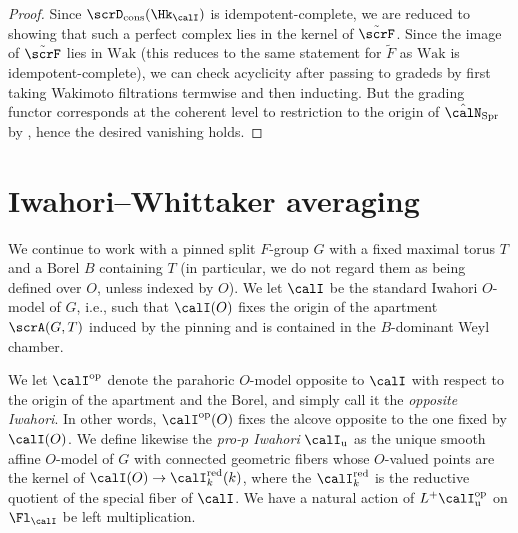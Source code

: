 \documentclass[10pt, reqno]{amsart}
\theoremstyle{plain}
\theoremstyle{definition}
\numberwithin{equation}{section}
\begin{document}
\begin{proof}
	Since $\scrD_{\mathrm{cons}}(\Hk_{\calI})$ is idempotent-complete, we are reduced to showing that such a perfect complex lies in the kernel of $\tilde{\scrF}$. %
	Since the image of $\tilde{\scrF}$ lies in $\mathrm{Wak}$ (this reduces to the same statement for $\tilde{F}$ as $\mathrm{Wak}$ is idempotent-complete), we can check acyclicity after passing to gradeds by first taking Wakimoto filtrations termwise and then inducting. But the grading functor corresponds at the coherent level to restriction to the origin of $\hat{\calN}_{\mathrm{Spr}}$ by , hence the desired vanishing holds. 
\end{proof}
\section{Iwahori--Whittaker averaging}

We continue to work with a pinned split $F$-group $G$ with a fixed maximal torus $T$ and a Borel $B$ containing $T$ (in particular, we do not regard them as being defined over $O$, unless indexed by $O$). We let $\calI$ be the standard Iwahori $O$-model of $G$, i.e., such that $\calI(O)$ fixes the origin of the apartment $\scrA(G,T)$ induced by the pinning and is contained in the $B$-dominant Weyl chamber.

We let $\calI^{\mathrm{op}}$ denote the parahoric $O$-model 
opposite to $\calI$ with respect to the origin of the apartment and the Borel, and simply call it the \textit{opposite Iwahori}. In other words, $\calI^{\mathrm{op}}(O)$ fixes the alcove opposite to the one fixed by $\calI(O)$. We define likewise the \textit{pro-$p$ Iwahori} $\calI_{\mathrm{u}}$ as the unique smooth affine $O$-model of $G$ with connected geometric fibers whose $O$-valued points are the kernel of $\calI(O)\to \calI_k^{\mathrm{red}}(k) $, where the $\calI_k^{\mathrm{red}}$ is the reductive quotient of the special fiber of $\calI$. We have a natural action of $L^+\calI_\mathrm{u}^\mathrm{op}$ on $\Fl_\calI$ be left multiplication.
\end{document}
